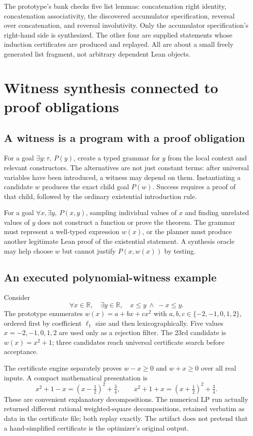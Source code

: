 \documentclass[11pt,a4paper]{article}
\newcommand{\R}{\mathbb R}
\begin{document}
The prototype's bank checks five list lemmas: concatenation right identity,
concatenation associativity, the discovered accumulator specification,
reversal over concatenation, and reversal involutivity. Only the accumulator
specification's right-hand side is synthesized. The other four are supplied
statements whose induction certificates are produced and replayed. All are
about a small freely generated list fragment, not arbitrary dependent Lean
objects.

\section{Witness synthesis connected to proof obligations}
\label{sec:witness}

\subsection{A witness is a program with a proof obligation}
For a goal $\exists y:\tau,\ P(y)$, create a typed grammar for $y$ from the
local context and relevant constructors. The alternatives are not just constant
terms: after universal variables have been introduced, a witness may depend on
them. Instantiating a candidate $w$ produces the exact child goal $P(w)$.
Success requires a proof of that child, followed by the ordinary existential
introduction rule.

For a goal $\forall x,\exists y,\ P(x,y)$, sampling individual values of $x$
and finding unrelated values of $y$ does not construct a function or prove the
theorem. The grammar must represent a well-typed expression $w(x)$, or the
planner must produce another legitimate Lean proof of the existential statement.
A synthesis oracle may help choose $w$ but cannot justify $P(x,w(x))$ by testing.

\subsection{An executed polynomial-witness example}
Consider
\[
 \forall x\in\R,\quad \exists y\in\R,\quad x\le y\ \wedge\ -x\le y.
\]
The prototype enumerates $w(x)=a+bx+cx^2$ with
$a,b,c\in\{-2,-1,0,1,2\}$, ordered first by coefficient $\ell_1$ size and then
lexicographically. Five values $x=-2,-1,0,1,2$ are used only as a rejection
filter. The 23rd candidate is $w(x)=x^2+1$; three candidates reach universal
certificate search before acceptance.

The certificate engine separately proves $w-x\ge0$ and $w+x\ge0$ over all real
inputs. A compact mathematical presentation is
\[
 x^2+1-x=(x-\tfrac12)^2+\tfrac34,\qquad
 x^2+1+x=(x+\tfrac12)^2+\tfrac34.
\]
These are convenient explanatory decompositions. The numerical LP run actually
returned different rational weighted-square decompositions, retained verbatim
as data in the certificate file; both replay exactly. The artifact does not
pretend that a hand-simplified certificate is the optimizer's original output.
\end{document}
